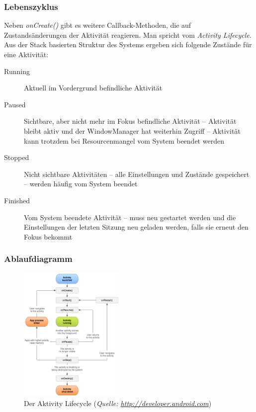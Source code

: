\begin{frame}[label=activities_states]
   \frametitle{Lebenszyklus}
   Neben \emph{onCreate()} gibt es weitere Callback-Methoden, die auf 
   Zustandsänderungen der Aktivität reagieren. Man spricht vom \emph{Activity Lifecycle}.\\

   Aus der Stack basierten Struktur des Systems ergeben sich folgende Zustände 
   für eine Aktivität:

   \begin{description}
      \item[Running] Aktuell im Vordergrund befindliche Aktivität
      \item[Paused] Sichtbare, aber nicht mehr im Fokus befindliche Aktivität --
         Aktivität bleibt aktiv und der WindowManager hat weiterhin Zugriff -- 
         Aktivität kann trotzdem bei Resourcenmangel vom System beendet werden
      \item[Stopped] Nicht sichtbare Aktivitäten -- alle Einstellungen und 
         Zustände gespeichert -- werden häufig vom System beendet
      \item[Finished] Vom System beendete Aktivität -- muss neu gestartet 
         werden und die Einstellungen der letzten Sitzung neu geladen werden, 
         falls sie erneut den Fokus bekommt
   \end{description}
\end{frame}

\begin{frame}[label=activities_lifecycle]
   \frametitle{Ablaufdiagramm}
   \begin{figure}[h!]
     \centering
     \includegraphics[width=0.45\textwidth]{pictures/activity_lifecycle.eps}
     \caption{
        Der Aktivity Lifecycle 
        (\emph{Quelle: 
           \href{http://developer.android.com}{http://developer.android.com}})
     }
     \label{fig:activity_lifecycle}
   \end{figure}
\end{frame}

